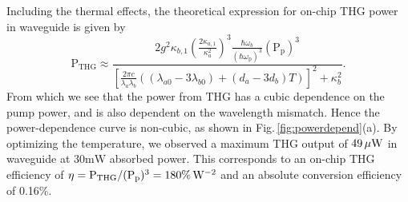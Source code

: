 \documentclass[9pt,twocolumn,twoside]{optica}
\begin{document}
Including the thermal effects, the theoretical expression for on-chip THG power in waveguide is given by
%
\begin{equation}
\mathrm{P_{THG}}\approx\frac{2g^{2}\kappa_{b,1}\left(\frac{2\kappa_{a,1}}{\kappa_{a}^{2}}\right)^{3}\frac{\hbar\omega_{b}}{(\hbar\omega_{\mathrm{p}})^{3}}(\mathrm{P}_{\mathrm{p}})^{3}}{[\frac{2\pi c}{\lambda_{a}\lambda_{b}}((\lambda_{a0}-3\lambda_{b0})+(d_a-3d_b)T)]^{2}+\kappa_{b}^{2}}.
\label{eq:thgpower}
\end{equation}
From which we see that the power from THG has a cubic dependence on the pump power, and is also dependent on the wavelength mismatch. Hence the power-dependence curve is non-cubic, as shown in Fig.$\,$\ref{fig:powerdepend}(a). By optimizing the temperature, we observed a maximum THG output of $\mathrm{49\thinspace} \mu \mathrm{W}$ in waveguide at $30\mathrm{mW}$ absorbed power. This corresponds to an on-chip THG efficiency of $\eta=\mathrm{P_{THG}}/(\mathrm{P_{p}})^{3}=180\%\thinspace\mathrm{W^{-2}}$ and an absolute conversion efficiency of 0.16\%.
\end{document}

